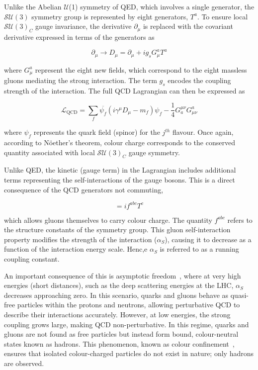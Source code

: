 Unlike the Abelian $\mathcal{U}$(1) symmetry of QED, which involves a single generator, the $\mathcal{SU}(3)$ symmetry group is represented by eight generators, $T^a$. To ensure local $\mathcal{SU}(3)_C$ gauge invariance, the derivative $\partial_\mu$ is replaced with the covariant derivative expressed in terms of the generators as

\begin{equation}
    \partial_\mu \rightarrow D_\mu = \partial_\mu + ig_sG^{a}_{\mu}T^{a}
\end{equation}

where $G^{a}_{\mu}$ represent the eight new fields, which correspond to the eight massless gluons mediating the strong interaction. The term $g_s$ encodes the coupling strength of the interaction. The full QCD Lagrangian can then be expressed as

\begin{equation} 
\mathcal{L}_{\text{QCD}} = \sum_{f}\overline{\psi_f}(i\gamma^\mu D_\mu - m_f)\psi_f - \frac{1}{4} G^{\mu\nu}_{a}G^{a}_{\mu\nu}
\end{equation}

where $\psi_f$ represents the quark field (spinor) for the $j^{th}$ flavour. Once again, according to N\"{o}ether's theorem, colour charge corresponds to the conserved quantity associated with local $\mathcal{SU}(3)_C$ gauge symmetry.

Unlike QED, the kinetic (gauge term) in the Lagrangian includes additional terms representing the self-interactions of the gauge bosons. This is a direct consequence of the QCD generators not commuting,

\begin{equation}
    [T^a,T^b] = if^{abc}T^c
\end{equation}

which allows gluons themselves to carry colour charge. The quantity $f^{abc}$ refers to the structure constants of the symmetry group. This gluon self-interaction property modifies the strength of the interaction ($\alpha_{S}$), causing it to decrease as a function of the interaction energy scale. Henc,e $\alpha_{S}$ is referred to as a running coupling constant.

An important consequence of this is asymptotic freedom~\cite{AsymptoticFreedom_1,AsymptoticFreedom_2}, where at very high energies (short distances), such as the deep scattering energies at the LHC, $\alpha_{S}$ decreases approaching zero. In this scenario, quarks and gluons behave as quasi-free particles within the protons and neutrons, allowing perturbative QCD to describe their interactions accurately. However, at low energies, the strong coupling grows large, making QCD non-perturbative. In this regime, quarks and gluons are not found as free particles but instead form bound, colour-neutral states known as hadrons. This phenomenon, known as colour confinement~\cite{MarkThompson}, ensures that isolated colour-charged particles do not exist in nature; only hadrons are observed.

